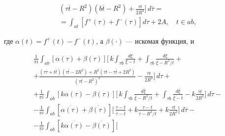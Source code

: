 \begin{thm}
\begin{multline*}
{(\tau\overline{t}-R^2)(b\overline{t}-R^2)}


+ \frac{\tau t}{2R^2}\bigg]\,d\overline{\tau} = \\


%


= \int_{at} [f^+(\tau)+f^-(\tau)]d\tau + 2A,\quad t\in ab ,


\end{multline*}


где $\alpha(t)=f^+(t)-f^-(t)$, а $\beta(\cdot)$ --- искомая функция, и


\begin{multline*}


\frac{1}{\pi i}\int_{ab} [\alpha(\tau)+\beta(\tau)]


\bigg[\, k\int_{\tau b}\frac{d\xi}{\xi-t}


+ \int_{\tau b}\frac{d\xi}{\xi-R^2/\overline{t}} + \\


%


+ \frac{(\tau\overline{\tau}+t\overline{t})(\tau\overline{t}-2R^2)


+R^2(\overline{\tau}t-\tau\overline{t}+2R^2)}


{(\tau \overline{t}-R^2)^2}


- \frac{\overline{\tau}t}{2R^2}\bigg]\,d\tau + \\


%


+ \frac{1}{\pi i}\int_{ab} [k\alpha(\tau)-\beta(\tau)] \bigg[\,


k\int_{\tau b}\frac{d\overline{\xi}}{\overline{\xi}-R^2/t}


+ \int_{\tau b}\frac{d\overline{\xi}}{\overline{\xi}-\overline{t}}


- k\frac{\overline{\tau}t}{2R^2} \bigg]\,d\tau - \\


%


- \frac{1}{\pi i}\int_{ab} [\overline{\alpha(\tau)}


+\overline{\beta(\tau)}] \bigg[\,


\frac{\tau-t}{\overline{\tau}-\overline{t}}


+ k\frac{\tau-t}{\overline{\tau}-R^2/t}


+ k\frac{\tau t}{2R^2} \bigg]\,d\overline{\tau} - \\


%


- \frac{1}{\pi i}\int_{ab} [k\overline{\alpha(\tau)}


-\overline{\beta(\tau)}] \bigg[\,



\end{multline*}
\end{thm}
